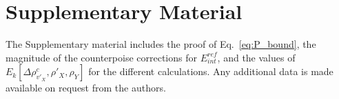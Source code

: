 \documentclass[amsmath,amssymb,preprint,aip,jcp]{revtex4-1}
\begin{document}
\section*{Supplementary Material}
The Supplementary material includes the proof of Eq.~\ref{eq:P_bound}, the magnitude of the counterpoise corrections for $E_{int}^{ref}$, and the values of $E_k[\Delta \rho^{c}_{v'_X}, \rho'_X, \rho_Y]$ for the different calculations.
Any additional data is made available on request from the authors.

\end{document}
